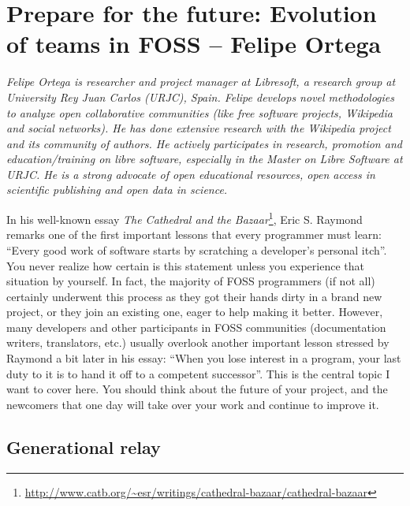 \chapter{Prepare for the future: Evolution of teams in FOSS -- Felipe Ortega}

\textit{Felipe Ortega is researcher and project manager at Libresoft, a research group
at University Rey Juan Carlos (URJC), Spain. Felipe develops novel
methodologies to analyze open collaborative communities (like free software
projects, Wikipedia and social networks). He has done extensive research with
the Wikipedia project and its community of authors. He actively
participates in research, promotion and education/training on libre software,
especially in the Master on Libre Software at URJC. He is a strong advocate of
open educational resources, open access in scientific publishing and open data
in science.}

In his well-known essay \textit{The Cathedral and the Bazaar}\footnote{\url{http://www.catb.org/~esr/writings/cathedral-bazaar/cathedral-bazaar}}, Eric S. Raymond remarks one of the first important lessons that every programmer must learn: ``Every good work of software starts by scratching a developer's personal itch''. You never realize how certain is this statement unless you experience that situation by yourself. In fact, the majority of FOSS programmers (if not all) certainly underwent this process as they got their hands dirty in a brand new project, or they join an existing one, eager to help making it better.
However, many developers and other participants in FOSS communities (documentation writers, translators, etc.) usually overlook another important lesson stressed by Raymond a bit later in his essay: ``When you lose interest in a program, your last duty to it is to hand it off to a competent successor''. This is the central topic I want to cover here. You should think about the future of your project, and the newcomers that one day will take over your work and continue to improve it.

\section*{Generational relay}

